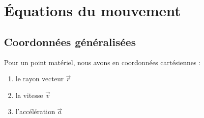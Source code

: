 \chapter{\'Equations du mouvement}
\section{Coordonn\'ees g\'en\'eralis\'ees}

Pour un point mat\'eriel, nous avons en coordonn\'ees cart\'esiennes :
\begin{enumerate}
\item le rayon vecteur $\vec{r}$
\item la vitesse $\vec{v}$
\item l'acc\'el\'eration $\vec{a}$
\end{enumerate}